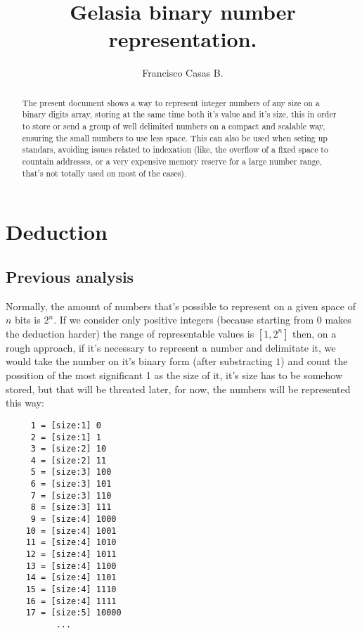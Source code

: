 \documentclass[a4paper,11pt]{article}
\title{Gelasia binary number representation.}
\author{Francisco Casas B.}
\begin{document}
\maketitle

\begin{abstract}
The present document shows a way to represent integer numbers of any size on a binary digits array, storing at the same time both it's value and it's size, this in order to store or send a group of well delimited numbers on a compact and scalable way, ensuring the small numbers to use less space. This can also be used when seting up standars, avoiding issues related to indexation (like, the overflow of a fixed space to countain addresses, or a very expensive memory reserve for a large number range, that's not totally used on most of the cases).
\end{abstract}

\tableofcontents

\section{Deduction}
\subsection{Previous analysis}
Normally, the amount of numbers that's possible to represent on a given space of $n$ bits is $2^n$. If we consider only positive integers (because starting from $0$ makes the deduction harder) the range of representable values is $[1,2^n]$ then, on a rough approach, if it's necessary to represent a number and delimitate it, we would take the number on it's binary form (after substracting $1$) and count the possition of the most significant 1 as the size of it, it's size has to be somehow stored, but that will be threated later, for now, the numbers will be represented this way:
\begin{center} \begin{lstlisting}
	 1 = [size:1] 0
	 2 = [size:1] 1
	 3 = [size:2] 10
	 4 = [size:2] 11
	 5 = [size:3] 100
	 6 = [size:3] 101
	 7 = [size:3] 110
	 8 = [size:3] 111
	 9 = [size:4] 1000
	10 = [size:4] 1001
	11 = [size:4] 1010
	12 = [size:4] 1011
	13 = [size:4] 1100
	14 = [size:4] 1101
	15 = [size:4] 1110
	16 = [size:4] 1111
	17 = [size:5] 10000
	      ...
\end{lstlisting} \end{center}
\end{document}
